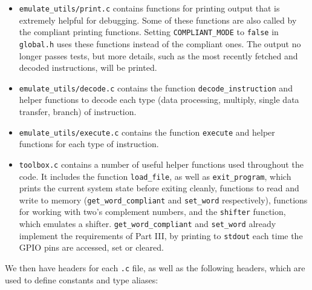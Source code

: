 \documentclass[10pt]{article}
\begin{document}
\begin{itemize}
\item \texttt{emulate\_utils/print.c} contains functions for printing output that is extremely helpful for debugging. Some of these functions are also called by the compliant printing functions. Setting \texttt{COMPLIANT\_MODE} to \texttt{false} in \texttt{global.h} uses these functions instead of the compliant ones. The output no longer passes tests, but more details, such as the most recently fetched and decoded instructions, will be printed.
\item \texttt{emulate\_utils/decode.c} contains the function \texttt{decode\_instruction} and helper functions to decode each type (data processing, multiply, single data transfer, branch) of instruction.
\item \texttt{emulate\_utils/execute.c} contains the function \texttt{execute} and helper functions for each type of instruction.
\item \texttt{toolbox.c} contains a number of useful helper functions used throughout the code. It includes the function \texttt{load\_file}, as well as \texttt{exit\_program}, which prints the current system state before exiting cleanly, functions to read and write to memory (\texttt{get\_word\_compliant} and \texttt{set\_word} respectively), functions for working with two's complement numbers, and the \texttt{shifter} function, which emulates a shifter. \texttt{get\_word\_compliant} and \texttt{set\_word} already implement the requirements of Part III, by printing to \texttt{stdout} each time the GPIO pins are accessed, set or cleared.
\end{itemize}

We then have headers for each \texttt{.c} file, as well as the following headers, which are used to define constants and type aliases:
\end{document}
